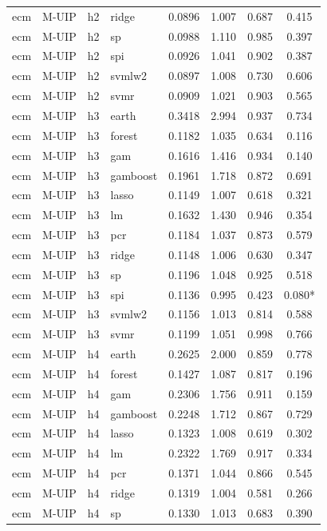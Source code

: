 \begin{ThreePartTable}
\begin{longtable}[t]{llclcccc}
ecm & M-UIP & h2 & ridge & 0.0896 & 1.007 & 0.687 & 0.415\\
ecm & M-UIP & h2 & sp & 0.0988 & 1.110 & 0.985 & 0.397\\
ecm & M-UIP & h2 & spi & 0.0926 & 1.041 & 0.902 & 0.387\\
ecm & M-UIP & h2 & svmlw2 & 0.0897 & 1.008 & 0.730 & 0.606\\
ecm & M-UIP & h2 & svmr & 0.0909 & 1.021 & 0.903 & 0.565\\
\addlinespace
ecm & M-UIP & h3 & earth & 0.3418 & 2.994 & 0.937 & 0.734\\
ecm & M-UIP & h3 & forest & 0.1182 & 1.035 & 0.634 & 0.116\\
ecm & M-UIP & h3 & gam & 0.1616 & 1.416 & 0.934 & 0.140\\
ecm & M-UIP & h3 & gamboost & 0.1961 & 1.718 & 0.872 & 0.691\\
ecm & M-UIP & h3 & lasso & 0.1149 & 1.007 & 0.618 & 0.321\\
ecm & M-UIP & h3 & lm & 0.1632 & 1.430 & 0.946 & 0.354\\
ecm & M-UIP & h3 & pcr & 0.1184 & 1.037 & 0.873 & 0.579\\
ecm & M-UIP & h3 & ridge & 0.1148 & 1.006 & 0.630 & 0.347\\
ecm & M-UIP & h3 & sp & 0.1196 & 1.048 & 0.925 & 0.518\\
ecm & M-UIP & h3 & spi & 0.1136 & 0.995 & 0.423 & 0.080*\\
ecm & M-UIP & h3 & svmlw2 & 0.1156 & 1.013 & 0.814 & 0.588\\
ecm & M-UIP & h3 & svmr & 0.1199 & 1.051 & 0.998 & 0.766\\
\addlinespace
ecm & M-UIP & h4 & earth & 0.2625 & 2.000 & 0.859 & 0.778\\
ecm & M-UIP & h4 & forest & 0.1427 & 1.087 & 0.817 & 0.196\\
ecm & M-UIP & h4 & gam & 0.2306 & 1.756 & 0.911 & 0.159\\
ecm & M-UIP & h4 & gamboost & 0.2248 & 1.712 & 0.867 & 0.729\\
ecm & M-UIP & h4 & lasso & 0.1323 & 1.008 & 0.619 & 0.302\\
ecm & M-UIP & h4 & lm & 0.2322 & 1.769 & 0.917 & 0.334\\
ecm & M-UIP & h4 & pcr & 0.1371 & 1.044 & 0.866 & 0.545\\
ecm & M-UIP & h4 & ridge & 0.1319 & 1.004 & 0.581 & 0.266\\
ecm & M-UIP & h4 & sp & 0.1330 & 1.013 & 0.683 & 0.390\\

\end{longtable}
\end{ThreePartTable}
